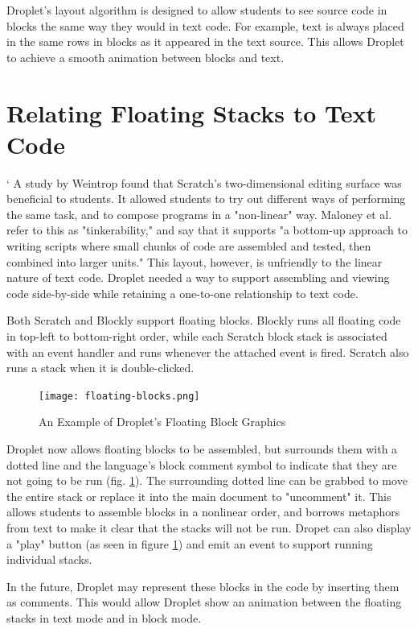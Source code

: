 \documentclass[conference]{IEEEtran}
\begin{document}
Droplet's layout algorithm is designed to allow students to see source code in blocks the same way they would in text code. For example, text is always placed in the same rows in blocks as it appeared in the text source. This allows Droplet to achieve a smooth animation between blocks and text.

\section{Relating Floating Stacks to Text Code}
`
A study by Weintrop \cite{Weintrop} found that Scratch's two-dimensional editing surface was beneficial to students. It allowed students to try out different ways of performing the same task, and to compose programs in a "non-linear" way. Maloney et al. \cite{Maloney} refer to this as "tinkerability," and say that it supports "a bottom-up approach to writing scripts where small chunks of code are assembled and tested, then combined into larger units." This layout, however, is unfriendly to the linear nature of text code. Droplet needed a way to support assembling and viewing code side-by-side while retaining a one-to-one relationship to text code.

Both Scratch and Blockly support floating blocks. Blockly runs all floating code in top-left to bottom-right order, while each Scratch block stack is associated with an event handler and runs whenever the attached event is fired. Scratch also runs a stack when it is double-clicked.

\begin{figure}
\centering
\texttt{[image: floating-blocks.png]}
\caption{An Example of Droplet's Floating Block Graphics}
\label{floating}
\end{figure}

Droplet now allows floating blocks to be assembled, but surrounds them with a dotted line and the language's block comment symbol to indicate that they are not going to be run (fig. \ref{floating}). The surrounding dotted line can be grabbed to move the entire stack or replace it into the main document to "uncomment" it. This allows students to assemble blocks in a nonlinear order, and borrows metaphors from text to make it clear that the stacks will not be run. Dropet can also display a "play" button (as seen in figure \ref{floating}) and emit an event to support running individual stacks.

In the future, Droplet may represent these blocks in the code by inserting them as comments. This would allow Droplet show an animation between the floating stacks in text mode and in block mode.
\end{document}
